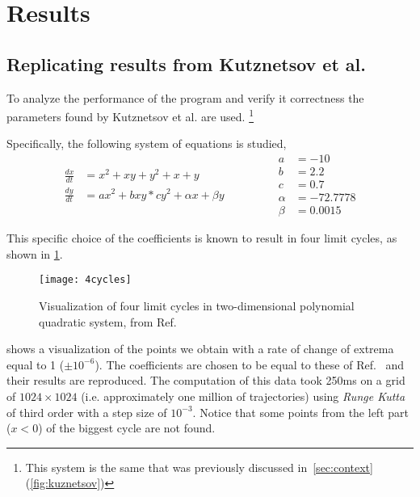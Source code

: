 
\section{Results}

\subsection{Replicating results from Kutznetsov et al.}

To analyze the performance of the program and verify it correctness the parameters found by Kutznetsov et al. \cite{kuznetsov_visualization_2013} are used. \footnote{This system is the same that was previously discussed in~\cref{sec:context} (\cref{fig:kuznetsov})}

Specifically, the following system of equations is studied,
\begin{equation}%
    \label{eq:kuznetsov}
    \begin{split}
        \frac{dx}{dt} &= x^2 + xy + y^2 + x + y\\
        \frac{dy}{dt} &= ax^2 + bxy * cy^2 + \alpha x + \beta y
    \end{split}
    \qquad \qquad
    \begin{split}
        a &= -10\\
        b &= 2.2\\
        c &= 0.7\\
        \alpha &= -72.7778\\
        \beta &= 0.0015
    \end{split}
\end{equation}

This specific choice of the coefficients is known to result in four limit
cycles, as shown in \cref{fig:kuznetsov2}.

\begin{figure}[H]
    \centering
    \texttt{[image: 4cycles]}
    \caption{Visualization of four limit cycles in two-dimensional polynomial quadratic system, from Ref.~\cite{kuznetsov_visualization_2013}
    }
    \label{fig:kuznetsov2}
\end{figure}

\pagebreak
{} shows a visualization of the points we obtain with a rate of change of extrema equal to 1 ($\pm 10^{-6}$). The coefficients are chosen to be equal to these of Ref.~\cite{kuznetsov_visualization_2013} and their results are reproduced. The computation of this data took 250ms on a grid of $1024 \times 1024$ (i.e. approximately one million of trajectories) using \emph{Runge Kutta} of third order with a step size of $10^{-3}$.
Notice that some points from the left part ($x < 0$) of the biggest cycle are not found.

